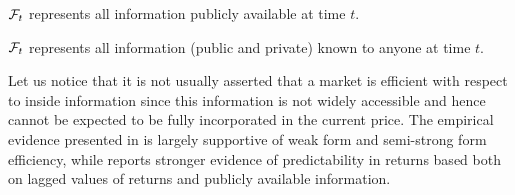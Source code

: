 \begin{definition}
	$\mathcal{F}_t$ represents all information publicly available at time $t$. 
\end{definition}

\begin{definition}
	$\mathcal{F}_t$ represents all information (public and private) known to anyone at time $t$.
\end{definition}
Let us notice that it is not usually asserted that a market is efficient with respect to inside information since this information is not widely accessible and hence cannot be expected to be fully incorporated in the current price. The empirical evidence presented in \cite{malkiel1970efficient} is largely supportive of weak form and semi-strong form efficiency, while \cite{fama1991efficient} reports stronger evidence of predictability in returns based both on lagged values of returns and publicly available information.


